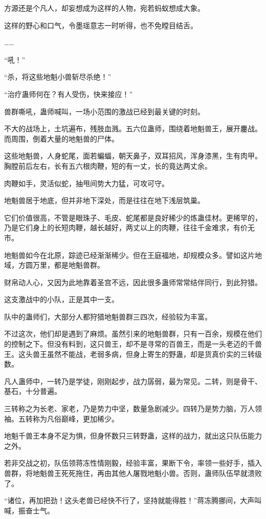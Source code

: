 \begin{this_body}
方源还是个凡人，却妄想成为这样的人物，宛若蚂蚁想成大象。

这样的野心和口气，令墨瑶意志一时听得，也不免瞠目结舌。

……

“吼！”

“杀，将这些地魁小兽斩尽杀绝！”

“治疗蛊师何在？有人受伤，快来接应！”

兽群嘶吼，蛊师喊叫，一场小范围的激战已经到最关键的时刻。

不大的战场上，土坑遍布，残肢血溅。五六位蛊师，围绕着地魁兽王，展开鏖战。而周围，倒着大量的地魁兽的尸体。

这些地魁兽，人身蛇尾，面若蝙蝠，朝天鼻子，双耳招风，浑身漆黑，生有肉甲。胸膛前后左右，长有五六根肉鞭，短的有一丈，长的竟达两丈余。

肉鞭如手，灵活似蛇，抽甩间势大力猛，可攻可守。

地魁兽居于地底，但并非地下深处，而是往往在地下浅层筑巢。

它们价值很高，不管是眼珠子、毛皮、蛇尾都是良好稀少的炼蛊佳材。更稀罕的，乃是它们身上的长短肉鞭，越长越好，两丈以上的肉鞭，往往千金难求，有价无市。

地魁兽如今在北原，踪迹已经渐渐稀少。但在王庭福地，却规模众多。譬如这片地域，方圆万里，都是地魁兽群。

财帛动人心，又因为此地靠着圣宫不远，因此很多蛊师常常结伴同行，到此狩猎。

这支激战中的小队，正是其中一支。

队中的蛊师们，大部分人都狩猎地魁兽群三四次，经验较为丰富。

不过这次，他们却是遇到了麻烦。虽然引来的地魁兽群，只有一百余，规模在他们的控制之下。但没有料到，这只兽王，却不是寻常的百兽王，而是一头老迈的千兽王。这头兽王虽然不能战，老弱多病，但身上寄生的野蛊，却是货真价实的三转级数。

凡人蛊师中，一转乃是学徒，刚刚起步，战力孱弱，最为常见。二转，则是骨干、基石，十分普遍。

三转称之为长老、家老，乃是势力中坚，数量急剧减少。四转乃是势力脑，万人领袖。五转称为凡俗巅峰，更加稀少。

地魁千兽王本身不足为惧，但身怀数只三转野蛊，这样的战力，就出这只队伍能力之外。

若非交战之初，队伍领蒋冻性情刚毅，经验丰富，果断下令，率领一些好手，插入兽群，将地魁兽王死死拖住，再由其他人屠戮地魁小兽。否则，蛊师队伍早就溃败了。

“诸位，再加把劲！这头老兽已经快不行了，坚持就能得胜！”蒋冻腾挪间，大声叫喊，振奋士气。


\end{this_body}
